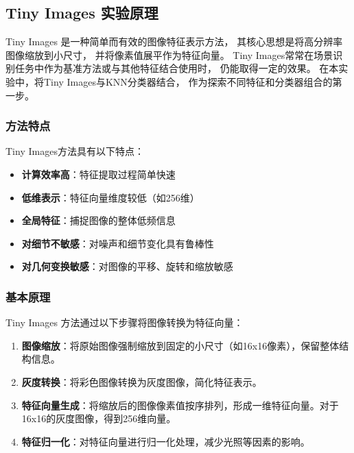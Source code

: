 \subsection{Tiny Images 实验原理}

Tiny Images 是一种简单而有效的图像特征表示方法，
其核心思想是将高分辨率图像缩放到小尺寸，
并将像素值展平作为特征向量。
Tiny Images常常在场景识别任务中作为基准方法或与其他特征结合使用时，
仍能取得一定的效果。
在本实验中，将Tiny Images与KNN分类器结合，
作为探索不同特征和分类器组合的第一步。

\subsubsection{方法特点}
Tiny Images方法具有以下特点：

\begin{itemize}
    \item \textbf{计算效率高}：特征提取过程简单快速
    \item \textbf{低维表示}：特征向量维度较低（如256维）
    \item \textbf{全局特征}：捕捉图像的整体低频信息
    \item \textbf{对细节不敏感}：对噪声和细节变化具有鲁棒性
    \item \textbf{对几何变换敏感}：对图像的平移、旋转和缩放敏感
\end{itemize}

\subsubsection{基本原理}
Tiny Images 方法通过以下步骤将图像转换为特征向量：

\begin{enumerate}
    \item \textbf{图像缩放}：将原始图像强制缩放到固定的小尺寸（如16x16像素），保留整体结构信息。
    
    \item \textbf{灰度转换}：将彩色图像转换为灰度图像，简化特征表示。
    
    \item \textbf{特征向量生成}：将缩放后的图像像素值按序排列，形成一维特征向量。对于16x16的灰度图像，得到256维向量。
    
    \item \textbf{特征归一化}：对特征向量进行归一化处理，减少光照等因素的影响。
\end{enumerate}